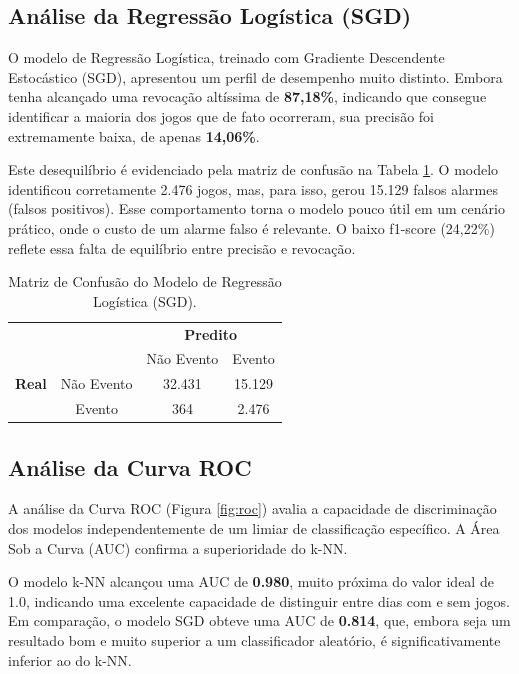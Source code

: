 \documentclass[12pt]{article}
\begin{document}
\subsection{Análise da Regressão Logística (SGD)}
O modelo de Regressão Logística, treinado com Gradiente Descendente Estocástico (SGD), apresentou um perfil de desempenho muito distinto. Embora tenha alcançado uma revocação altíssima de \textbf{87,18\%}, indicando que consegue identificar a maioria dos jogos que de fato ocorreram, sua precisão foi extremamente baixa, de apenas \textbf{14,06\%}.

Este desequilíbrio é evidenciado pela matriz de confusão na Tabela \ref{tab:sgd_matrix}. O modelo identificou corretamente 2.476 jogos, mas, para isso, gerou 15.129 falsos alarmes (falsos positivos). Esse comportamento torna o modelo pouco útil em um cenário prático, onde o custo de um alarme falso é relevante. O baixo f1-score (24,22\%) reflete essa falta de equilíbrio entre precisão e revocação.

\begin{table}[h!]
    \centering
    \caption{Matriz de Confusão do Modelo de Regressão Logística (SGD).}
    \label{tab:sgd_matrix}
    \begin{tabular}{cc|cc}
        & & \multicolumn{2}{c}{\textbf{Predito}} \\
        & & Não Evento & Evento \\ \hline
        \textbf{Real} & Não Evento & 32.431 & 15.129 \\
        & Evento & 364 & 2.476
    \end{tabular}
\end{table}

\subsection{Análise da Curva ROC}
A análise da Curva ROC (Figura \ref{fig:roc}) avalia a capacidade de discriminação dos modelos independentemente de um limiar de classificação específico. A Área Sob a Curva (AUC) confirma a superioridade do k-NN.

O modelo k-NN alcançou uma AUC de \textbf{0.980}, muito próxima do valor ideal de 1.0, indicando uma excelente capacidade de distinguir entre dias com e sem jogos. Em comparação, o modelo SGD obteve uma AUC de \textbf{0.814}, que, embora seja um resultado bom e muito superior a um classificador aleatório, é significativamente inferior ao do k-NN.
\end{document}
